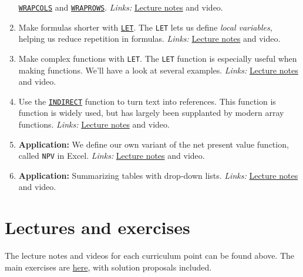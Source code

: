\documentclass[
  letterpaper,
  DIV=11,
  numbers=noendperiod]{scrreprt}
\begin{document}
\begin{enumerate}
  \href{https://exceljet.net/functions/wrapcols-function}{\texttt{WRAPCOLS}}
  and
  \href{https://exceljet.net/functions/wraprows-function}{\texttt{WRAPROWS}}.
  \emph{Links:}
  \href{https://github.com/BI-DS/ELE-3915/blob/main/slides/lecture05/wrapcols_wraprows.xlsx}{Lecture
  notes} and video.
\item
  Make formulas shorter with
  \href{https://exceljet.net/functions/let-function}{\texttt{LET}}. The
  \texttt{LET} lets us define \emph{local variables}, helping us reduce
  repetition in formulas. \emph{Links:}
  \href{https://github.com/BI-DS/ELE-3915/blob/main/slides/lecture05/let_simple_formulas.xlsx}{Lecture
  notes} and video.
\item
  Make complex functions with \texttt{LET}. The \texttt{LET} function is
  especially useful when making functions. We'll have a look at several
  examples. \emph{Links:}
  \href{https://github.com/BI-DS/ELE-3915/blob/main/slides/lecture05/let_complex_functions.xlsx}{Lecture
  notes} and video.
\item
  Use the
  \href{https://exceljet.net/functions/indirect-function}{\texttt{INDIRECT}}
  function to turn text into references. This function is function is
  widely used, but has largely been supplanted by modern array
  functions. \emph{Links:}
  \href{https://github.com/BI-DS/ELE-3915/blob/main/slides/lecture05/indirect_function.xlsx}{Lecture
  notes} and video.
\item
  \textbf{Application:} We define our own variant of the net present
  value function, called \texttt{NPV} in Excel. \emph{Links:}
  \href{https://github.com/BI-DS/ELE-3915/blob/main/slides/lecture05/your_own_npv.xlsx}{Lecture
  notes} and video.
\item
  \textbf{Application:} Summarizing tables with drop-down lists.
  \emph{Links:}
  \href{https://github.com/BI-DS/ELE-3915/blob/main/slides/lecture05/summarizing_tables.xlsx}{Lecture
  notes} and video.
\end{enumerate}

\hypertarget{lectures-and-exercises-4}{%
\section{Lectures and exercises}\label{lectures-and-exercises-4}}

The lecture notes and videos for each curriculum point can be found
above. The main exercises are
\href{https://github.com/BI-DS/ELE-3915/blob/main/exercises/exercises05.xlsx}{here},
with solution proposals included.
\end{document}
